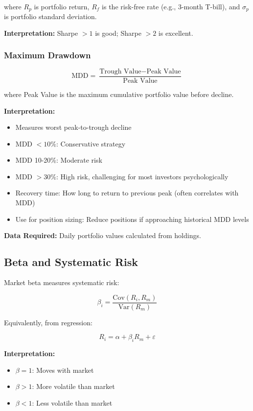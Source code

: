 \documentclass[11pt,a4paper]{article}
\begin{document}
where $R_p$ is portfolio return, $R_f$ is the risk-free rate (e.g., 3-month T-bill), and $\sigma_p$ is portfolio standard deviation.

\textbf{Interpretation:} Sharpe $> 1$ is good; Sharpe $> 2$ is excellent.

\subsubsection{Maximum Drawdown}

\begin{equation}
\text{MDD} = \frac{\text{Trough Value} - \text{Peak Value}}{\text{Peak Value}}
\end{equation}

where Peak Value is the maximum cumulative portfolio value before decline.

\textbf{Interpretation:}
\begin{itemize}
    \item Measures worst peak-to-trough decline
    \item MDD $< 10\%$: Conservative strategy
    \item MDD 10-20\%: Moderate risk
    \item MDD $> 30\%$: High risk, challenging for most investors psychologically
    \item Recovery time: How long to return to previous peak (often correlates with MDD)
    \item Use for position sizing: Reduce positions if approaching historical MDD levels
\end{itemize}

\textbf{Data Required:} Daily portfolio values calculated from holdings.

\subsection{Beta and Systematic Risk}

Market beta measures systematic risk:

\begin{equation}
\beta_i = \frac{\text{Cov}(R_i, R_m)}{\text{Var}(R_m)}
\end{equation}

Equivalently, from regression:

\begin{equation}
R_i = \alpha + \beta_i R_m + \varepsilon
\end{equation}

\textbf{Interpretation:}
\begin{itemize}
    \item $\beta = 1$: Moves with market
    \item $\beta > 1$: More volatile than market
    \item $\beta < 1$: Less volatile than market
\end{itemize}
\end{document}
